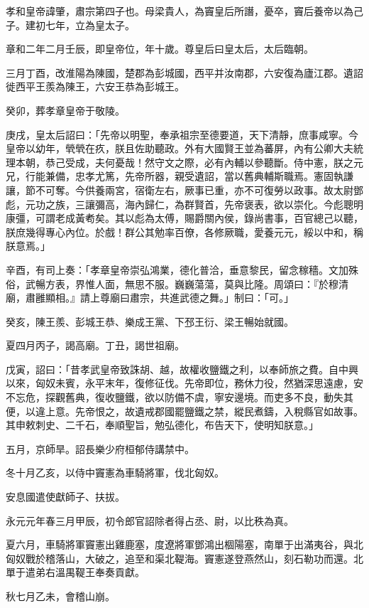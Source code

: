 
\begin{pinyinscope}
孝和皇帝諱肇，肅宗第四子也。母梁貴人，為竇皇后所譖，憂卒，竇后養帝以為己子。建初七年，立為皇太子。

章和二年二月壬辰，即皇帝位，年十歲。尊皇后曰皇太后，太后臨朝。

三月丁酉，改淮陽為陳國，楚郡為彭城國，西平并汝南郡，六安復為廬江郡。遺詔徙西平王羨為陳王，六安王恭為彭城王。

癸卯，葬孝章皇帝于敬陵。

庚戌，皇太后詔曰：「先帝以明聖，奉承祖宗至德要道，天下清靜，庶事咸寧。今皇帝以幼年，煢煢在疚，朕且佐助聽政。外有大國賢王並為蕃屏，內有公卿大夫統理本朝，恭己受成，夫何憂哉！然守文之際，必有內輔以參聽斷。侍中憲，朕之元兄，行能兼備，忠孝尤篤，先帝所器，親受遺詔，當以舊典輔斯職焉。憲固執謙讓，節不可奪。今供養兩宮，宿衛左右，厥事已重，亦不可復勞以政事。故太尉鄧彪，元功之族，三讓彌高，海內歸仁，為群賢首，先帝褒表，欲以崇化。今彪聰明康彊，可謂老成黃耇矣。其以彪為太傅，賜爵關內侯，錄尚書事，百官總己以聽，朕庶幾得專心內位。於戲！群公其勉率百僚，各修厥職，愛養元元，綏以中和，稱朕意焉。」

辛酉，有司上奏：「孝章皇帝崇弘鴻業，德化普洽，垂意黎民，留念稼穡。文加殊俗，武暢方表，界惟人面，無思不服。巍巍蕩蕩，莫與比隆。周頌曰：『於穆清廟，肅雝顯相。』請上尊廟曰肅宗，共進武德之舞。」制曰：「可。」

癸亥，陳王羨、彭城王恭、樂成王黨、下邳王衍、梁王暢始就國。

夏四月丙子，謁高廟。丁丑，謁世祖廟。

戊寅，詔曰：「昔孝武皇帝致誅胡、越，故權收鹽鐵之利，以奉師旅之費。自中興以來，匈奴未賓，永平末年，復修征伐。先帝即位，務休力役，然猶深思遠慮，安不忘危，探觀舊典，復收鹽鐵，欲以防備不虞，寧安邊境。而吏多不良，動失其便，以違上意。先帝恨之，故遺戒郡國罷鹽鐵之禁，縱民煮鑄，入稅縣官如故事。其申敕刺史、二千石，奉順聖旨，勉弘德化，布告天下，使明知朕意。」

五月，京師旱。詔長樂少府桓郁侍講禁中。

冬十月乙亥，以侍中竇憲為車騎將軍，伐北匈奴。

安息國遣使獻師子、扶拔。

永元元年春三月甲辰，初令郎官詔除者得占丞、尉，以比秩為真。

夏六月，車騎將軍竇憲出雞鹿塞，度遼將軍鄧鴻出棝陽塞，南單于出滿夷谷，與北匈奴戰於稽落山，大破之，追至和渠北鞮海。竇憲遂登燕然山，刻石勒功而還。北單于遣弟右溫禺鞮王奉奏貢獻。

秋七月乙未，會稽山崩。


\end{pinyinscope}
